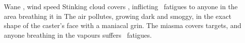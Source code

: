   {\mAir}%
  {Wane}%
  {\detailed,\duplicated}%
  {wind speed}%
  {Stinking cloud covers \spellArea, inflicting ~\glspl{fatigue} to anyone in the area breathing it in}%
  {
    The air pollutes, growing dark and smoggy, in the exact shape of the caster's face with a maniacal grin.
    The miasma covers \spellArea targets, and anyone breathing in the vapours suffers ~\glspl{fatigue}.
  }


